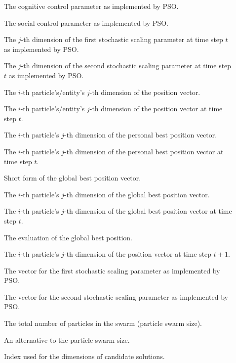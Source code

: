 \begin{description}
	\item [\parbox{2cm}{$c_{1}$}] The cognitive control parameter as implemented by \acs{PSO}.
	\item [\parbox{2cm}{$c_{2}$}] The social control parameter as implemented by \acs{PSO}.
	\item [\parbox{2cm}{$r_{1_{j}}(t)$}] The $j$-th dimension of the first stochastic scaling parameter at time step $t$ as implemented by \acs{PSO}.
	\item [\parbox{2cm}{$r_{2_{j}}(t)$}] The $j$-th dimension of the second stochastic scaling parameter at time step $t$ as implemented by \acs{PSO}.
	\item [\parbox{2cm}{$x_{ij}$}] The $i$-th particle's/entity's $j$-th dimension of the position vector.
	\item [\parbox{2cm}{$x_{ij}(t)$}] The $i$-th particle's/entity's $j$-th dimension of the position vector at time step $t$.
	\item [\parbox{2cm}{$y_{ij}$}] The $i$-th particle's $j$-th dimension of the personal best position vector.
	\item [\parbox{2cm}{$y_{ij}(t)$}] The $i$-th particle's $j$-th dimension of the personal best position vector at time step $t$.
	\item [\parbox{2cm}{$\boldsymbol{\hat{y}}$}] Short form of the global best position vector.
	\item [\parbox{2cm}{$\hat{y}_{ij}$}] The $i$-th particle's $j$-th dimension of the global best position vector.
	\item [\parbox{2cm}{$\hat{y}_{ij}(t)$}] The $i$-th particle's $j$-th dimension of the global best position vector at time step $t$.
	\item [\parbox{2cm}{$f(\hat{y})$}] The evaluation of the global best position.
	\item [\parbox{2cm}{$x_{ij}(t+1)$}] The $i$-th particle's $j$-th dimension of the position vector at time step $t+1$.
	\item [\parbox{2cm}{$\boldsymbol{r}_{1}$}] The vector for the first stochastic scaling parameter as implemented by \acs{PSO}.
	\item [\parbox{2cm}{$\boldsymbol{r}_{2}$}] The vector for the second stochastic scaling parameter as implemented by \acs{PSO}.
	\item [\parbox{2cm}{$I$}] The total number of particles in the swarm (particle swarm size).
	\item [\parbox{2cm}{$N$}] An alternative to the particle swarm size.
	\item [\parbox{2cm}{$j$}] Index used for the dimensions of candidate solutions.

\end{description}

